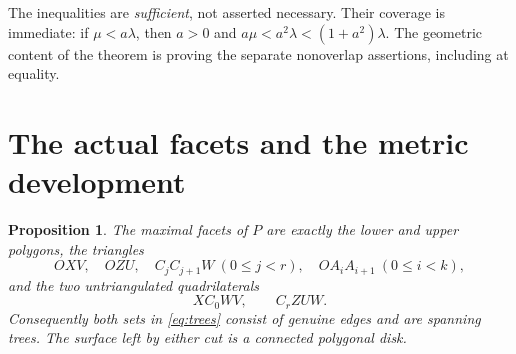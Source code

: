 \documentclass[a4paper,11pt]{amsart}
\newtheorem{proposition}[theorem]{Proposition}
\begin{document}
The inequalities are \emph{sufficient}, not asserted necessary. Their coverage is immediate: if $\mu<a\lambda$, then $a>0$ and $a\mu<a^2\lambda<(1+a^2)\lambda$. The geometric content of the theorem is proving the separate nonoverlap assertions, including at equality.

\section{The actual facets and the metric development}
\begin{proposition}\label{prop:facets}
The maximal facets of $P$ are exactly the lower and upper polygons, the triangles
\[
 OXV,\quad OZU,\quad
 C_jC_{j+1}W\ (0\leq j<r),\quad
 OA_iA_{i+1}\ (0\leq i<k),
\]
and the two untriangulated quadrilaterals
\[
 XC_0WV,\qquad C_rZUW.
\]
Consequently both sets in \eqref{eq:trees} consist of genuine edges and are spanning trees. The surface left by either cut is a connected polygonal disk.
\end{proposition}
\end{document}
